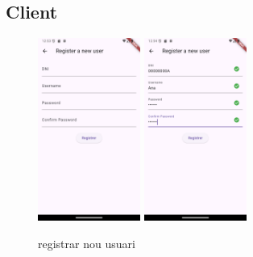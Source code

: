 \documentclass[a4paper,12pt,twoside]{ThesisStyle}
\begin{document}
\subsection{Client}
\label{subsec: Client}

\begin{figure}[h]
    \centering
    \includegraphics[width=0.3\textwidth]{imatges/registerUser.png}
    \includegraphics[width=0.3\textwidth]{imatges/registerUserWithvalues.png}
    \caption{ registrar nou usuari}
    \label{fig: registrar nou usuari}
\end{figure}
\end{document}
